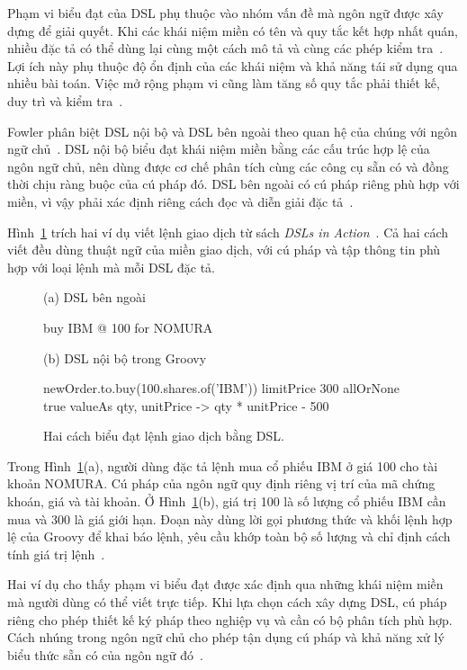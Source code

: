\documentclass[12pt,a4paper,oneside]{extreport}
\begin{document}
Phạm vi biểu đạt của DSL phụ thuộc vào nhóm vấn đề mà ngôn ngữ được xây dựng để giải quyết. Khi các khái niệm miền có tên và quy tắc kết hợp nhất quán, nhiều đặc tả có thể dùng lại cùng một cách mô tả và cùng các phép kiểm tra~\cite{ref-6}. Lợi ích này phụ thuộc độ ổn định của các khái niệm và khả năng tái sử dụng qua nhiều bài toán. Việc mở rộng phạm vi cũng làm tăng số quy tắc phải thiết kế, duy trì và kiểm tra~\cite{ref-6}.

Fowler phân biệt DSL nội bộ và DSL bên ngoài theo quan hệ của chúng với ngôn ngữ chủ~\cite{ref-27}. DSL nội bộ biểu đạt khái niệm miền bằng các cấu trúc hợp lệ của ngôn ngữ chủ, nên dùng được cơ chế phân tích cùng các công cụ sẵn có và đồng thời chịu ràng buộc của cú pháp đó. DSL bên ngoài có cú pháp riêng phù hợp với miền, vì vậy phải xác định riêng cách đọc và diễn giải đặc tả~\cite{ref-27}.

Hình~\ref{fig:1-1} trích hai ví dụ viết lệnh giao dịch từ sách \emph{DSLs in Action}~\cite{ref-43}. Cả hai cách viết đều dùng thuật ngữ của miền giao dịch, với cú pháp và tập thông tin phù hợp với loại lệnh mà mỗi DSL đặc tả.

\begin{figure}
\centering
\begin{minipage}{0.85\linewidth}
\raggedright\small
(a) DSL bên ngoài
\begin{thesiscode}
buy IBM @ 100 for NOMURA
\end{thesiscode}
(b) DSL nội bộ trong Groovy
\begin{thesiscode}
newOrder.to.buy(100.shares.of('IBM')) {
  limitPrice   300
  allOrNone    true
  valueAs      {qty, unitPrice -> qty * unitPrice - 500}
}
\end{thesiscode}
\end{minipage}
\caption{Hai cách biểu đạt lệnh giao dịch bằng DSL.}\label{fig:1-1}
\end{figure}

Trong Hình~\ref{fig:1-1}(a), người dùng đặc tả lệnh mua cổ phiếu IBM ở giá 100 cho tài khoản NOMURA. Cú pháp của ngôn ngữ quy định riêng vị trí của mã chứng khoán, giá và tài khoản. Ở Hình~\ref{fig:1-1}(b), giá trị 100 là số lượng cổ phiếu IBM cần mua và 300 là giá giới hạn. Đoạn này dùng lời gọi phương thức và khối lệnh hợp lệ của Groovy để khai báo lệnh, yêu cầu khớp toàn bộ số lượng và chỉ định cách tính giá trị lệnh~\cite{ref-43}.

Hai ví dụ cho thấy phạm vi biểu đạt được xác định qua những khái niệm miền mà người dùng có thể viết trực tiếp. Khi lựa chọn cách xây dựng DSL, cú pháp riêng cho phép thiết kế ký pháp theo nghiệp vụ và cần có bộ phân tích phù hợp. Cách nhúng trong ngôn ngữ chủ cho phép tận dụng cú pháp và khả năng xử lý biểu thức sẵn có của ngôn ngữ đó~\cite{ref-27}.
\end{document}
